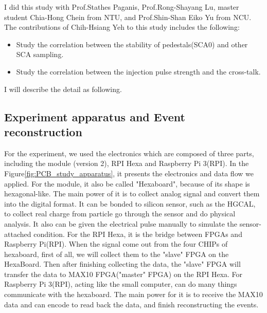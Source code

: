 I did this study with Prof.Stathes Paganis, Prof.Rong-Shayang Lu, master student Chia-Hong Chein from NTU, and Prof.Shin-Shan Eiko Yu from NCU.  The contributions of Chih-Hsiang Yeh to this study includes the following:
\begin{itemize}
\item Study the correlation between the stability of pedestals(SCA0) and other SCA sampling.
\item Study the correlation between the injection pulse strength and the cross-talk.
\end{itemize}
I will describe the detail as following.

\subsection{Experiment apparatus and Event reconstruction}

For the experiment, we used the electronics which are composed of three parts, including the module (version 2), RPI Hexa and Raspberry Pi 3(RPI). In the Figure\ref{fig:PCB_study_apparatus}, it presents the electronics and data flow we applied. For the module, it also be called "Hexaboard", because of its shape is hexagonal-like. The main power of it is to collect analog signal and convert them into the digital format. It can be bonded to silicon sensor, such as the HGCAL, to collect real charge from particle go through the sensor and do physical analysis. It also can be given the electrical pulse manually to simulate the sensor-attached condition. For the RPI Hexa, it is the bridge between FPGAs and Raspberry Pi(RPI). When the signal come out from the four CHIPs of hexaboard, first of all, we will collect them to the "slave" FPGA on the HexaBoard. Then after finishing collecting the data, the "slave" FPGA will transfer the data to MAX10 FPGA("master" FPGA) on the RPI Hexa. For Raspberry Pi 3(RPI), acting like the small computer, can do many things communicate with the hexaboard. The main power for it is to receive the MAX10 data and can encode to read back the data, and finish reconstructing the events.

